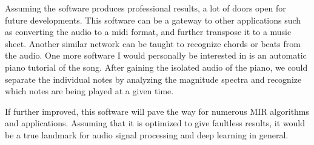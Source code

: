 \documentclass[../Thesis.tex]{subfiles}
\begin{document}
Assuming the software produces professional results, a lot of doors open for future developments. This software can be a gateway to other applications such as converting the audio to a midi format, and further transpose it to a music sheet. Another similar network can be taught to recognize chords or beats from the audio. One more software I would personally be interested in is an automatic piano tutorial of the song. After gaining the isolated audio of the piano, we could separate the individual notes by analyzing the magnitude spectra and recognize which notes are being played at a given time. 

If further improved, this software will pave the way for numerous MIR algorithms and applications. Assuming that it is optimized to give faultless results, it would be a true landmark for audio signal processing and deep learning in general.
\end{document}
